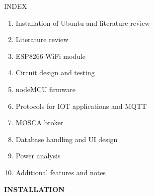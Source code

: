 \documentclass[16pt]{article}
\begin{document}
\begin{tabbing}
	\hspace{5cm}
        \LARGE{INDEX}                %
\end{tabbing}

\vspace{0.5cm}

\begin{enumerate}
\item
  Installation of Ubuntu and literature review
\item
  Literature review 
\item
  ESP8266 WiFi module 
\item
  Circuit design and testing 
\item
  nodeMCU firmware
\item
  Protocols for IOT applications and MQTT
\item
  MOSCA broker 
\item 
  Database handling and UI design 
\item 
  Power analysis
\item 
  Additional features and notes 

\end{enumerate}


\vspace{11.5cm}


{\textbf{\LARGE{INSTALLATION} }   }

\vspace{1cm}                                    %
\end{document}
